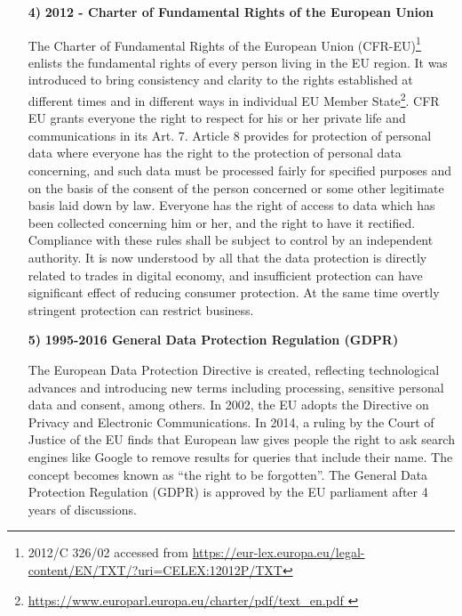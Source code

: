 \begin{multicols}{2}
\begin{itemize}
Asia Pacific Economic Cooperation (APEC)\footnote{\url{https://www.apec.org/Publications/2005/12/APEC-Privacy-Framework}} Privacy Framework is a set of principles and implementation guidelines that were created in order to establish effective privacy protections that avoid barriers to information flows, and ensure continued trade and economic growth. The idea was to have a regime for effective information privacy protection and the free flow of information in the Asia-Pacific region for improving consumer confidence and ensuring the growth of electronic commerce. CPEA creates a framework for the voluntary sharing of information and provision of assistance for information privacy enforcement related activities. 

\item[{\bf 4)}]\textbf{2012 - Charter of Fundamental Rights of the European Union}

The Charter of Fundamental Rights of the European Union (CFR-EU)\footnote{2012/C 326/02 accessed from \url{https://eur-lex.europa.eu/legal-content/EN/TXT/?uri=CELEX:12012P/TXT}} enlists the fundamental rights of every person living in the EU region. It was introduced to bring consistency and clarity to the rights established at different times and in different ways in individual EU Member State\footnote{\url{https://www.europarl.europa.eu/charter/pdf/text\_en.pdf }}. CFR EU grants everyone the right to respect for his or her private life and communications in its Art. 7. Article 8 provides for protection of personal data where everyone has the right to the protection of personal data concerning, and such data must be processed fairly for specified purposes and on the basis of the consent of the person concerned or some other legitimate basis laid down by law. Everyone has the right of access to data which has been collected concerning him or her, and the right to have it rectified. Compliance with these rules shall be subject to control by an independent authority. It is now understood by all that the data protection is directly related to trades in digital economy, and insufficient protection can have significant effect of reducing consumer protection. At the same time overtly stringent protection can restrict business. 

\item[{\bf 5)}] \textbf{1995-2016 General Data Protection Regulation (GDPR)}

The European Data Protection Directive is created, reflecting technological advances and introducing new terms including processing, sensitive personal data and consent, among others. In 2002, the EU adopts the Directive on Privacy and Electronic Communications. In 2014, a ruling by the Court of Justice of the EU finds that European law gives people the right to ask search engines like Google to remove results for queries that include their name. The concept becomes known as “the right to be forgotten”. The General Data Protection Regulation (GDPR) is approved by the EU parliament after 4 years of discussions.


\end{itemize}
\end{multicols}
